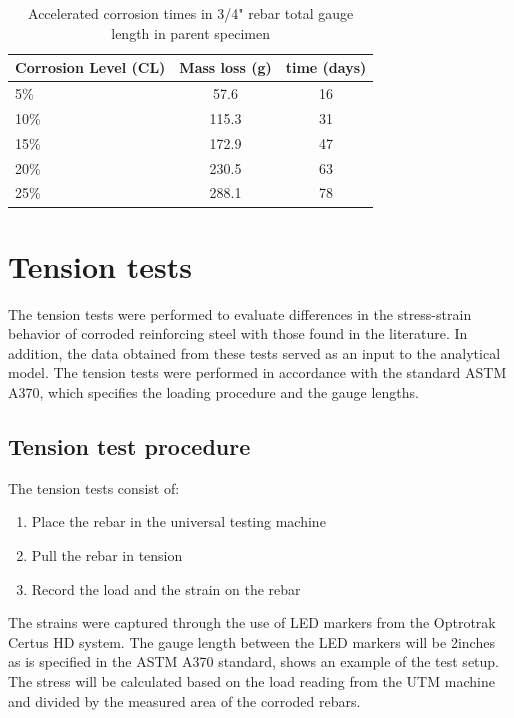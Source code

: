 \begin{table}[htbp]
	\caption{Accelerated corrosion times in 3/4" rebar total gauge length in parent specimen}
	\label{tab:AcceleratedCorrosionTime}
	\centering	
		\begin{tabular}{l c c}
		Corrosion Level (CL) & Mass loss (g)   & time (days)     \\  \hline	
		5\%                  & 57.6            & 16    \\	
		10\%                 & 115.3            & 31     \\	
		15\%                 & 172.9            & 47   \\	
		20\%                 & 230.5            & 63     \\
		25\%                 & 288.1               & 78   \\
		\end{tabular}
\end{table}

\section{Tension tests}

The tension tests were performed to evaluate differences in the stress-strain behavior of corroded reinforcing steel with those found in the literature. In addition, the data obtained from these tests served as an input to the analytical model. The tension tests were performed in accordance with the standard ASTM A370, which specifies the loading procedure and the gauge lengths. 
\subsection{Tension test procedure}

The tension tests consist of:
\begin{enumerate}
    \item Place the rebar in the universal testing machine
    \item Pull the rebar in tension 
    \item Record the load and the strain on the rebar 
\end{enumerate}

The strains were captured through the use of LED markers from the Optrotrak Certus HD system. The gauge length between the LED markers will be 2inches as is specified in the ASTM A370 standard,  shows an example of the test setup. The stress will be calculated based on the load reading from the UTM machine and divided by the measured area of the corroded rebars.

